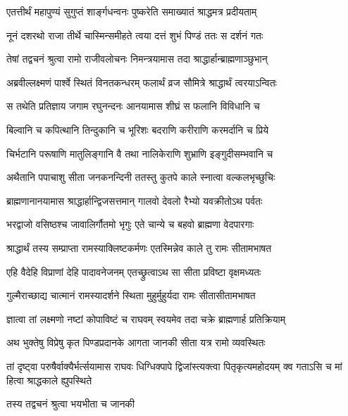 \twolineshloka
{एतत्तीर्थं महापुण्यं सुगुप्तं शार्ङ्गधन्वनः}
{पुष्करेति समाख्यातं श्राद्धमत्र प्रदीयताम्}%

\twolineshloka
{नूनं दशरथो राजा तीर्थे चास्मिन्समीहते}
{त्वया दत्तं शुभं पिण्डं ततः स दर्शनं गतः}%


\twolineshloka
{तेषां तद्वचनं श्रुत्वा रामो राजीवलोचनः}
{निमन्त्रयामास तदा श्राद्धार्हान्ब्राह्मणाञ्छुभान्}%

\twolineshloka
{अब्रवील्लक्ष्मणं पार्श्वे स्थितं विनतकन्धरम्}
{फलार्थं व्रज सौमित्रे श्राद्धार्थं त्वरयाऽन्वितः}%

\twolineshloka
{स तथेति प्रतिज्ञाय जगाम रघुनन्दनः}
{आनयामास शीघ्रं स फलानि विविधानि च}%

\twolineshloka
{बिल्वानि च कपित्थानि तिन्दुकानि च भूरिशः}
{बदराणि करीराणि करमर्दानि च प्रिये}%

\twolineshloka
{चिर्भटानि परूषाणि मातुलिङ्गानि वै तथा}
{नालिकेराणि शुभ्राणि इङ्गुदीसम्भवानि च}%

\twolineshloka
{अथैतानि पपाचाशु सीता जनकनन्दिनी}
{ततस्तु कुतपे काले स्नात्वा वल्कलभृच्छुचिः}%

\twolineshloka
{ब्राह्मणानानयामास श्राद्धार्हान्द्विजसत्तमान्}
{गालवो देवलो रैभ्यो यवक्रीतोऽथ पर्वतः}%

\twolineshloka
{भरद्वाजो वसिष्ठश्च जावालिर्गौतमो भृगुः}
{एते चान्ये च बहवो ब्राह्मणा वेदपारगाः}%

\twolineshloka
{श्राद्धार्थं तस्य सम्प्राप्ता रामस्याक्लिष्टकर्मणः}
{एतस्मिन्नेव काले तु रामः सीतामभाषत}%

\twolineshloka
{एहि वैदेहि विप्राणां देहि पादावनेजनम्}
{एतच्छ्रुत्वाऽथ सा सीता प्रविष्टा वृक्षमध्यतः}%

\twolineshloka
{गुल्मैराच्छाद्य चात्मानं रामस्यादर्शने स्थिता}
{मुहुर्मुहुर्यदा रामः सीतासीतामभाषत}%

\twolineshloka
{ज्ञात्वा तां लक्ष्मणो नष्टां कोपाविष्टं च राघवम्}
{स्वयमेव तदा चक्रे ब्राह्मणार्ह प्रतिक्रियाम्}%

\twolineshloka
{अथ भुक्तेषु विप्रेषु कृत पिण्डप्रदानके}
{आगता जानकी सीता यत्र रामो व्यवस्थितः}%

\threelineshloka
{तां दृष्ट्वा परुषैर्वाक्यैर्भर्त्सयामास राघवः}
{धिग्धिक्पापे द्विजांस्त्यक्त्वा पितृकृत्यमहोदयम्}
{क्व गताऽसि च मां हित्वा श्राद्धकाले ह्युपस्थिते}%


\onelineshloka
{तस्य तद्वचनं श्रुत्वा भयभीता च जानकी}%

